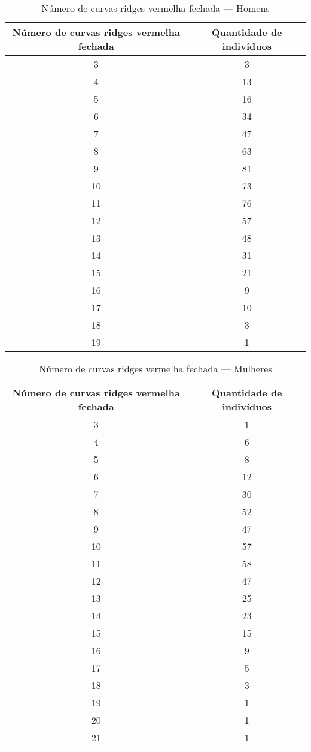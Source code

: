 \documentclass[a4paper,12pt]{article}
\begin{document}
\begin{table}[h!]
\centering
\caption{Número de curvas ridges vermelha fechada — Homens}
\begin{tabular}{c c}
\hline
\textbf{Número de curvas ridges vermelha fechada} & \textbf{Quantidade de indivíduos} \\ 
\hline
3  & 3   \\
4  & 13  \\
5  & 16  \\
6  & 34  \\
7  & 47  \\
8  & 63  \\
9  & 81  \\
10 & 73  \\
11 & 76  \\
12 & 57  \\
13 & 48  \\
14 & 31  \\
15 & 21  \\
16 & 9   \\
17 & 10  \\
18 & 3   \\
19 & 1   \\
\hline
\end{tabular}
\end{table}


\begin{table}[h!]
\centering
\caption{Número de curvas ridges vermelha fechada — Mulheres}
\begin{tabular}{c c}
\hline
\textbf{Número de curvas ridges vermelha fechada} & \textbf{Quantidade de indivíduos} \\ 
\hline
3  & 1   \\
4  & 6   \\
5  & 8   \\
6  & 12  \\
7  & 30  \\
8  & 52  \\
9  & 47  \\
10 & 57  \\
11 & 58  \\
12 & 47  \\
13 & 25  \\
14 & 23  \\
15 & 15  \\
16 & 9   \\
17 & 5   \\
18 & 3   \\
19 & 1   \\
20 & 1   \\
21 & 1   \\
\hline
\end{tabular}
\end{table}
\end{document}
